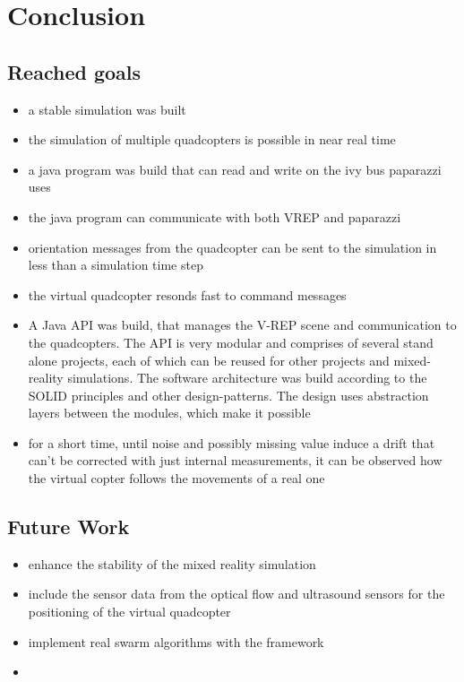 \chapter{Conclusion}
\label{sec:conclusion}


\section{Reached goals}
\begin{itemize}
\item{a stable simulation was built}
\item{the simulation of multiple quadcopters is possible in near real time}
\item{a java program was build that can read and write on the ivy bus paparazzi uses}
\item{the java program can communicate with both VREP and paparazzi}
\item{orientation messages from the quadcopter can be sent to the simulation in less than a simulation time step}
\item{the virtual quadcopter resonds fast to command messages}
\item{
A Java API was build, that manages the V-REP scene and communication to the quadcopters. The API is very modular and comprises of several stand alone projects, each of which can be reused for other projects and mixed-reality simulations. The software architecture was build according to the SOLID principles and other design-patterns. The design uses abstraction layers between the modules, which make it possible 
}

\item{for a short time, until noise and possibly missing value induce a drift that can't be corrected with just internal measurements, it can be observed how the virtual copter follows the movements of a real one}
\end{itemize}




\section{Future Work}
\begin{itemize}
\item{enhance the stability of the mixed reality simulation}
\item{include the sensor data from the optical flow and ultrasound sensors for the positioning of the virtual quadcopter}
\item{implement real swarm algorithms with the framework}
\item{}
\end{itemize}




